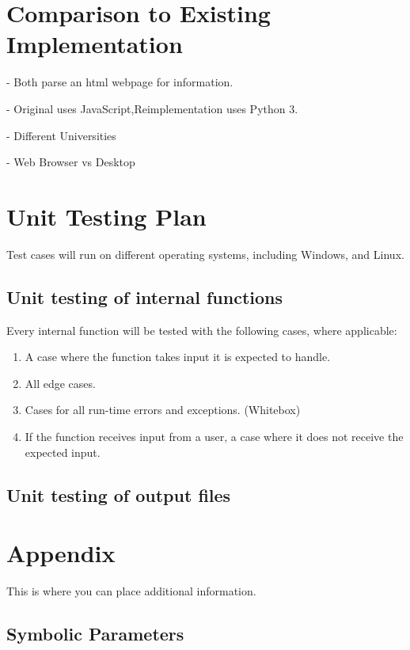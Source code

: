 \documentclass[12pt, titlepage]{article}
\begin{document}
\section{Comparison to Existing Implementation}	
- Both parse an html webpage for information.

- Original uses JavaScript,Reimplementation uses Python 3.

- Different Universities

- Web Browser vs Desktop


\section{Unit Testing Plan}
Test cases will run on different operating systems, including Windows, and Linux.	
\subsection{Unit testing of internal functions}
Every internal function will be tested with the following cases, where applicable: 

\begin{enumerate}
\item A case where the function takes input it is expected to handle. 
\item All edge cases.
\item Cases for all run-time errors and exceptions. (Whitebox)
\item If the function receives input from a user, a case where it does not receive the expected input.
\end{enumerate}
	
\subsection{Unit testing of output files}		





\newpage

\section{Appendix}

This is where you can place additional information.

\subsection{Symbolic Parameters}
\end{document}
